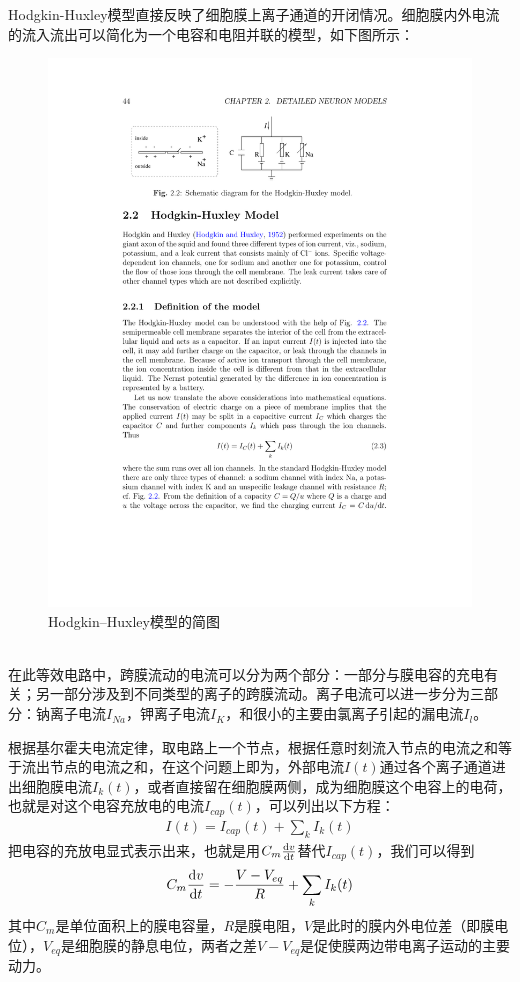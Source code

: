 \documentclass[
pdflinks,
]{xjtuthesis}
\begin{document}
Hodgkin-Huxley模型直接反映了细胞膜上离子通道的开闭情况。细胞膜内外电流的流入流出可以简化为一个电容和电阻并联的模型，如下图所示\cite{gerstner2002spiking}：
\begin{figure}[!ht]
\centering
\includegraphics[scale=1]{figures/moxingjiantu.pdf}
\caption{Hodgkin–Huxley模型的简图}
\end{figure}\\
在此等效电路中，跨膜流动的电流可以分为两个部分：一部分与膜电容的充电有关；另一部分涉及到不同类型的离子的跨膜流动。离子电流可以进一步分为三部分：钠离子电流$I_{Na}$，钾离子电流$I_K$，和很小的主要由氯离子引起的漏电流$I_l$。

\medskip
根据基尔霍夫电流定律，取电路上一个节点，根据任意时刻流入节点的电流之和等于流出节点的电流之和，在这个问题上即为，外部电流$I(t)$通过各个离子通道进出细胞膜电流$I_{k}(t)$，或者直接留在细胞膜两侧，成为细胞膜这个电容上的电荷，也就是对这个电容充放电的电流$I_{cap}(t)$，可以列出以下方程：
\begin{align}
I(t)=I_{cap}(t)+\sum_k I_{k}(t)
\end{align}
把电容的充放电显式表示出来，也就是用$C_m\frac{\mathrm d v}{\mathrm d t}$替代$I_{cap}(t)$，我们可以得到
\begin{align}
C_m \frac{\mathrm d v}{\mathrm d t}=-\dfrac{V-V_{eq}}{R}+\sum_k I_{k}(t)
\end{align}
其中$C_m$是单位面积上的膜电容量，$R$是膜电阻，$V$是此时的膜内外电位差（即膜电位），$V_{eq}$是细胞膜的静息电位，两者之差$V-V_{eq}$是促使膜两边带电离子运动的主要动力。
\end{document}
